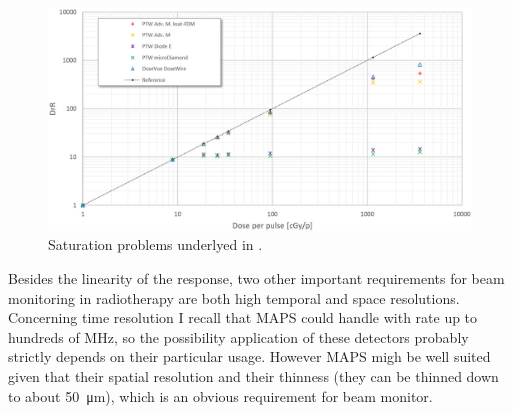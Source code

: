             \begin{figure}
                \centering
                \includegraphics[width=.9\linewidth]{figures/pixel_detectors_usage/saturation1.png}
                \caption{Saturation problems underlyed in \cite{FLASH_dosimeters}. }
                \label{fig:saturation_dosimeters}
            \end{figure}            
            

            Besides the linearity of the response, two other important requirements for beam monitoring in radiotherapy are both high temporal and space resolutions. 
            Concerning time resolution I recall that MAPS could handle with rate up to hundreds of \si{MHz}, so the possibility application of these detectors probably strictly depends on their particular usage.       
            However MAPS migh be well suited given that their spatial resolution and their thinness (they can be thinned down to about \SI{50}{\um}), which is an obvious requirement for beam monitor.